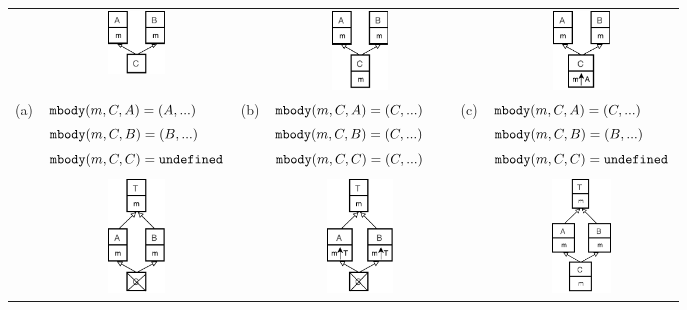 \begin{figure}[t]
	\vspace{-1ex}
	\hspace{-15pt}\begin{tabular}{clclcl}
		&\multicolumn{1}{c}{\includegraphics[width=1.5cm]{pics/P1.pdf}} & &
		\multicolumn{1}{c}{\includegraphics[width=1.5cm]{pics/P2.pdf}} & &
		\multicolumn{1}{c}{\includegraphics[width=1.5cm]{pics/P3.pdf}} \\
		(a) & $\texttt{mbody}(m,C,A) = (A,...)$\ \ \  & (b) & $\texttt{mbody}(m,C,A) = (C,...)$\ \ \  & (c) & $\texttt{mbody}(m,C,A) = (C,...)$ \\
		& $\texttt{mbody}(m,C,B) = (B,...)$ & & $\texttt{mbody}(m,C,B) = (C,...)$ & & $\texttt{mbody}(m,C,B) = (B,...)$ \\
		& $\texttt{mbody}(m,C,C) = \texttt{undefined}$ & & $\texttt{mbody}(m,C,C) = (C,...)$ & & $\texttt{mbody}(m,C,C) = \texttt{undefined}$ \\
		& & & & & \\
		& \multicolumn{1}{c}{\includegraphics[height=3cm]{pics/P4.pdf}} & &
		\multicolumn{1}{c}{\includegraphics[height=3cm]{pics/P5.pdf}} & & 
		\multicolumn{1}{c}{\includegraphics[height=3cm]{pics/P6.pdf}} \\ 

\end{tabular}
\end{figure}
